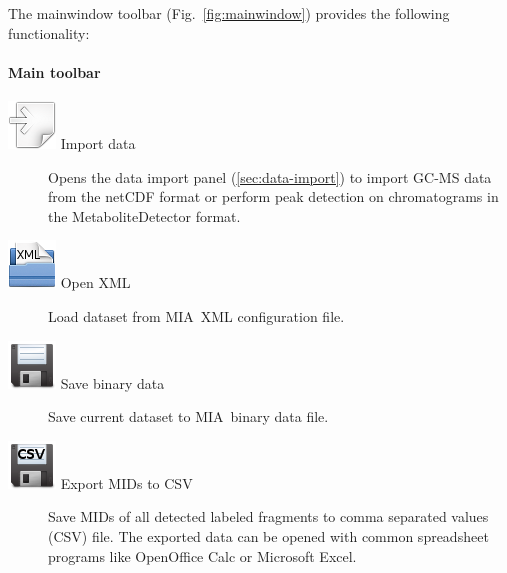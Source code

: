 \documentclass[a4paper,12pt]{scrartcl}
\newcommand*\app{\textsc{MIA}}
\begin{document}
The mainwindow toolbar (Fig.~\ref{fig:mainwindow}) provides the following functionality:

\paragraph{Main toolbar}
\label{sec:maintoolbar}

\begin{description}

\item[\includegraphics{../gui/icons/document-import.png} Import data]
Opens the data import panel (\ref{sec:data-import}) to import GC-MS data from the netCDF format or perform peak detection on chromatograms in the MetaboliteDetector \citep{Hiller2009} format.

\item[\includegraphics{../gui/icons/document-open-xml.png} Open XML]
Load dataset from \app\ XML configuration file.

\item[\includegraphics{gfx/ico_save.png} Save binary data]
Save current dataset to \app\ binary data file.


\item[\includegraphics{../gui/icons/document-save-csv.png} Export MIDs to CSV]
Save MIDs of all detected labeled fragments to comma separated values (CSV) file. The exported data can be opened with common spreadsheet programs like OpenOffice Calc or Microsoft Excel.


\end{description}
\end{document}
